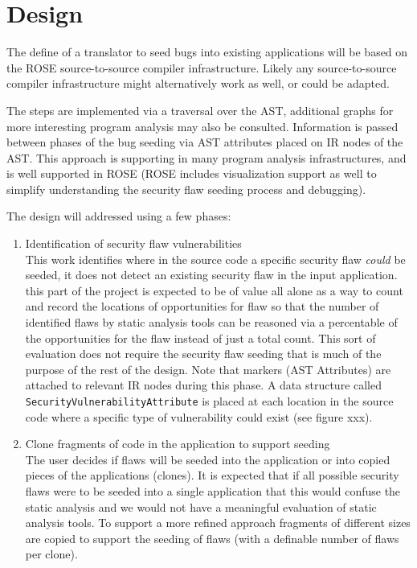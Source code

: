 \section{Design}

The define of a translator to seed bugs into existing applications will be based on 
the ROSE source-to-source compiler infrastructure.  Likely any source-to-source
compiler infrastructure might alternatively work as well, or could be adapted.

   The steps are implemented via a traversal over the AST, additional graphs
for more interesting program analysis may also be consulted.  Information is passed 
between phases of the bug seeding via AST attributes placed on IR nodes of the 
AST.  This approach is supporting in many program analysis infrastructures, and is
well supported in ROSE (ROSE includes visualization support as well to simplify
understanding the security flaw seeding process and debugging).

The design will addressed using a few phases:
\begin{enumerate}
   \item Identification of security flaw vulnerabilities \\
   This work identifies where in the source code a specific security flaw {\em could}
be seeded, it does not detect an existing security flaw in the input application.
this part of the project is expected to be of value all alone as a way to count
and record the locations of opportunities for flaw so that the number of identified
flaws by static analysis tools can be reasoned via a percentable of the opportunities
for the flaw instead of just a total count.  This sort of evaluation does not
require the security flaw seeding that is much of the purpose of the rest of the
design.  Note that markers (AST Attributes) are attached to relevant IR nodes during this
phase.  A data structure called {\tt SecurityVulnerabilityAttribute} is placed at
each location in the source code where a specific type of vulnerability could exist
(see figure xxx).

   \item Clone fragments of code in the application to support seeding \\
   The user decides if flaws will be seeded into the application or into copied pieces 
of the applications (clones). It is expected that if all possible security flaws were to
be seeded into a single application that this would confuse the static analysis and 
we would not have a meaningful evaluation of static analysis tools.  To support 
a more refined approach fragments of different sizes are copied to support the 
seeding of flaws (with a definable number of flaws per clone).


\end{enumerate}
